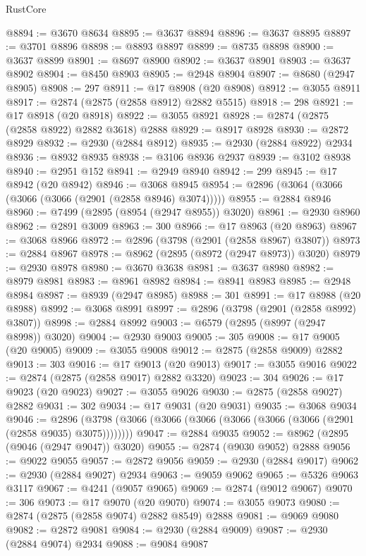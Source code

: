 \begin{lexlean}{RustCore}
\begin{coremodule}
@8894 := @3670 @8634
@8895 := @3637 @8894
@8896 := @3637 @8895
@8897 := @3701 @8896
@8898 := @8893 @8897
@8899 := @8735 @8898
@8900 := @3637 @8899
@8901 := @8697 @8900
@8902 := @3637 @8901
@8903 := @3637 @8902
@8904 := @8450 @8903
@8905 := @2948 @8904
@8907 := @8680 (@2947 @8905)
@8908 := 297
@8911 := @17 @8908 (@20 @8908)
@8912 := @3055 @8911
@8917 := @2874 (@2875 (@2858 @8912) @2882 @5515)
@8918 := 298
@8921 := @17 @8918 (@20 @8918)
@8922 := @3055 @8921
@8928 := @2874 (@2875 (@2858 @8922) @2882 @3618) @2888
@8929 := @8917 @8928
@8930 := @2872 @8929
@8932 := @2930 (@2884 @8912)
@8935 := @2930 (@2884 @8922) @2934
@8936 := @8932 @8935
@8938 := @3106 @8936 @2937
@8939 := @3102 @8938
@8940 := @2951 @152
@8941 := @2949 @8940
@8942 := 299
@8945 := @17 @8942 (@20 @8942)
@8946 := @3068 @8945
@8954 := @2896 (@3064 (@3066 (@3066 (@3066 (@2901 (@2858 @8946) @3074)))))
@8955 := @2884 @8946
@8960 := @7499 (@2895 (@8954 (@2947 @8955)) @3020)
@8961 := @2930 @8960
@8962 := @2891 @3009
@8963 := 300
@8966 := @17 @8963 (@20 @8963)
@8967 := @3068 @8966
@8972 := @2896 (@3798 (@2901 (@2858 @8967) @3807))
@8973 := @2884 @8967
@8978 := @8962 (@2895 (@8972 (@2947 @8973)) @3020)
@8979 := @2930 @8978
@8980 := @3670 @3638
@8981 := @3637 @8980
@8982 := @8979 @8981
@8983 := @8961 @8982
@8984 := @8941 @8983
@8985 := @2948 @8984
@8987 := @8939 (@2947 @8985)
@8988 := 301
@8991 := @17 @8988 (@20 @8988)
@8992 := @3068 @8991
@8997 := @2896 (@3798 (@2901 (@2858 @8992) @3807))
@8998 := @2884 @8992
@9003 := @6579 (@2895 (@8997 (@2947 @8998)) @3020)
@9004 := @2930 @9003
@9005 := 305
@9008 := @17 @9005 (@20 @9005)
@9009 := @3055 @9008
@9012 := @2875 (@2858 @9009) @2882
@9013 := 303
@9016 := @17 @9013 (@20 @9013)
@9017 := @3055 @9016
@9022 := @2874 (@2875 (@2858 @9017) @2882 @3320)
@9023 := 304
@9026 := @17 @9023 (@20 @9023)
@9027 := @3055 @9026
@9030 := @2875 (@2858 @9027) @2882
@9031 := 302
@9034 := @17 @9031 (@20 @9031)
@9035 := @3068 @9034
@9046 := @2896 (@3798 (@3066 (@3066 (@3066 (@3066 (@3066 (@3066 (@2901 (@2858 @9035) @3075))))))))
@9047 := @2884 @9035
@9052 := @8962 (@2895 (@9046 (@2947 @9047)) @3020)
@9055 := @2874 (@9030 @9052) @2888
@9056 := @9022 @9055
@9057 := @2872 @9056
@9059 := @2930 (@2884 @9017)
@9062 := @2930 (@2884 @9027) @2934
@9063 := @9059 @9062
@9065 := @5326 @9063 @3117
@9067 := @4241 (@9057 @9065)
@9069 := @2874 (@9012 @9067)
@9070 := 306
@9073 := @17 @9070 (@20 @9070)
@9074 := @3055 @9073
@9080 := @2874 (@2875 (@2858 @9074) @2882 @8549) @2888
@9081 := @9069 @9080
@9082 := @2872 @9081
@9084 := @2930 (@2884 @9009)
@9087 := @2930 (@2884 @9074) @2934
@9088 := @9084 @9087

\end{coremodule}
\end{lexlean}
